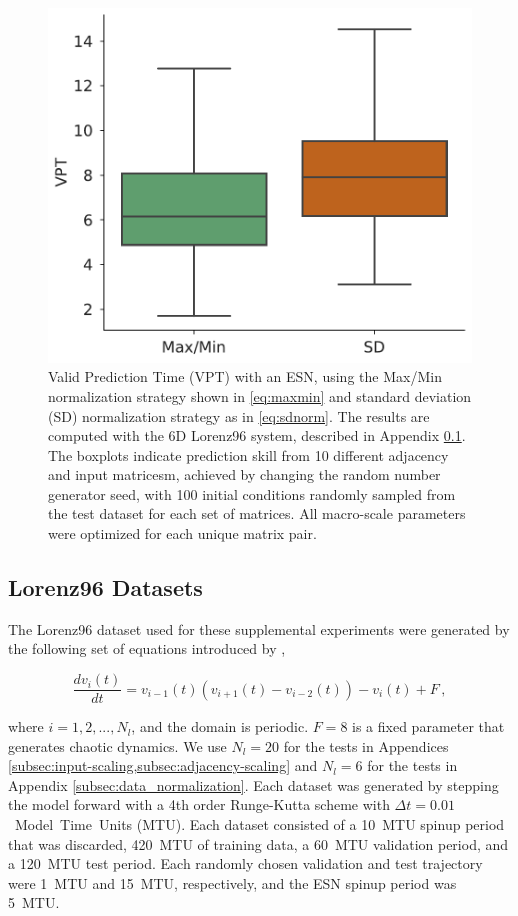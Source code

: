 \begin{figure}
    \centering
    \includegraphics[width=.6\textwidth]{../figures/data-normalization.pdf}
    \caption{Valid Prediction Time (VPT) with an ESN, using the
        Max/Min normalization strategy shown in \cref{eq:maxmin} and standard
        deviation (SD)
        normalization strategy as in \cref{eq:sdnorm}.
        The results are computed with the 6D Lorenz96 system, described in
        Appendix \cref{subsec:lorenz96}.
        The boxplots indicate prediction skill from 10 different adjacency and
        input matricesm, achieved by changing the random number generator seed,
        with 100 initial conditions randomly sampled from the test dataset for
        each set of matrices.
        All macro-scale parameters were optimized for each unique matrix pair.
    }
    \label{fig:data-norm}
\end{figure}

\subsection{Lorenz96 Datasets}
\label{subsec:lorenz96}

The Lorenz96 dataset used for these supplemental experiments were generated by
the following set of equations introduced by \citet{lorenz_predictability_1996},
\begin{linenomath*}\begin{equation*}
    \frac{dv_i(t)}{dt} = v_{i-1}(t)(v_{i+1}(t) - v_{i-2}(t)) - v_i(t) + F \, ,
    \label{eq:lorenz96}
\end{equation*}\end{linenomath*}
where $i=1,2,...,N_{l}$, and the domain is periodic.
$F=8$ is a fixed parameter that generates chaotic dynamics.
We use $N_l = 20$ for the tests in
Appendices \cref{subsec:input-scaling,subsec:adjacency-scaling} and $N_l = 6$ for the tests
in Appendix \cref{subsec:data_normalization}.
Each dataset was generated by stepping the model forward with a 4th order
Runge-Kutta scheme with $\Delta t = 0.01$~Model~Time~Units (MTU).
Each dataset consisted of a 10~MTU spinup period that was discarded, 420~MTU of
training data, a 60~MTU validation period, and a 120~MTU test
period.
Each randomly chosen validation and test trajectory were 1~MTU and 15~MTU,
respectively, and the ESN spinup period was 5~MTU.
